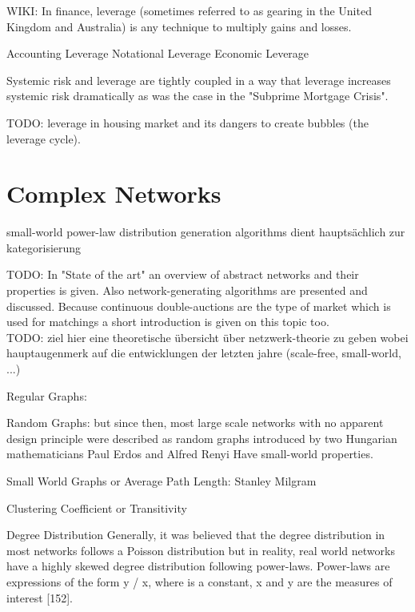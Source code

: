 \documentclass[../Bachelorarbeit.tex]{subfiles}
\begin{document}
WIKI: In finance, leverage (sometimes referred to as gearing in the United Kingdom and Australia) is any technique to multiply gains and losses.

Accounting Leverage
Notational Leverage
Economic Leverage

Systemic risk and leverage are tightly coupled in a way that leverage increases systemic risk dramatically as was the case in the "Subprime Mortgage Crisis".

TODO: leverage in housing market and its dangers to create bubbles (the leverage cycle).

\section{Complex Networks}
\label{sec:theory_complexNetworks}
small-world
power-law distribution
generation algorithms
dient hauptsächlich zur kategorisierung
		
TODO:
In "State of the art" an overview of abstract networks and their properties is given. Also network-generating algorithms are presented and discussed. Because continuous double-auctions are the type of market which is used for matchings a short introduction is given on this topic too.\\

TODO: ziel hier eine theoretische übersicht über  netzwerk-theorie zu geben wobei hauptaugenmerk auf die entwicklungen der letzten jahre (scale-free, small-world, ...)

Regular Graphs: \citep[vgl.]{BarabasiAlbert_StatisticalMechanics} \citep[vgl.]{Newman_ComplexNetworks}

Random Graphs: but since then, most large scale networks with no apparent design principle were described as random graphs introduced by two Hungarian mathematicians Paul Erdos and Alfred Renyi \citep[vgl.]{ErdosRenyi_RandomGraphs} \citep[vgl.]{ErdosRenyi_EvolutionRandomGraphs} Have small-world properties.

Small World Graphs or Average Path Length: Stanley Milgram \citep{TraverMilgram_StudySmallWorld} \citep{Milgram_SmallWorld} \citep{Kleinberg_SmallworldAlgorithmic}

Clustering Coefficient or Transitivity \citep{WattsStrogatz_DynamicsSmallWorld}

Degree Distribution \citep{BarabasiAlbert_EmergenceScaling} Generally, it was believed that the degree distribution in most networks follows a
Poisson distribution but in reality, real world networks have a highly skewed degree distribution following power-laws. Power-laws are expressions of the form y / x, where is a constant, x and y are the measures of interest [152].
\end{document}
